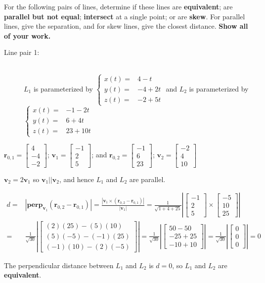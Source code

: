 \documentclass{article}
\newcommand{\abs}[1]{\left|#1\right|}
\newcommand{\colvec}[3]{\begin{bmatrix} #1 \\ #2 \\ #3 \end{bmatrix}}
\newcommand{\dr}[1]{\textcolor{dark_red}{#1}}
\begin{document}
For the following pairs of lines, determine if these lines are \textbf{equivalent}; are \textbf{parallel but not equal}; \textbf{intersect} at a single point; or are \textbf{skew}. For parallel lines, give the separation, and for skew lines, give the closest distance. \textbf{Show all of your work.}


\begin{description}
\item[Line pair 1:] ~ \\
\(L_1\) is parameterized by \(\left\{\begin{array}{rl} x(t) = & 4 - t \\ y(t) = & -4 + 2t \\ z(t) = & -2 + 5t \end{array}\right.\) and
\(L_2\) is parameterized by \(\left\{\begin{array}{rl} x(t) = & -1 - 2t \\ y(t) = & 6 + 4t \\ z(t) = & 23 + 10t \end{array}\right.\)
\end{description}

\dr{\(\mathbf{r}_{0,1} = \colvec{4}{-4}{-2}\); \(\mathbf{v}_1 = \colvec{-1}{2}{5}\); and \(\mathbf{r}_{0,2} = \colvec{-1}{6}{23}\); \(\mathbf{v}_2 = \colvec{-2}{4}{10}\)}

\dr{\(\mathbf{v}_2 = 2\mathbf{v}_1\) so \(\mathbf{v}_1 || \mathbf{v}_2\), and hence \(L_1\) and \(L_2\) are parallel.}

\dr{\begin{align*}
d = & \abs{\textbf{perp}_{\mathbf{v}_1}(\mathbf{r}_{0,2} - \mathbf{r}_{0,1})} 
= \frac{\abs{\mathbf{v}_1 \times (\mathbf{r}_{0,2} - \mathbf{r}_{0,1})}}{\abs{\mathbf{v}_1}} 
= \frac{1}{\sqrt{1 + 4 + 25}}\abs{\colvec{-1}{2}{5} \times \colvec{-5}{10}{25}} \\
= & \frac{1}{\sqrt{30}}\abs{\colvec{(2)(25) - (5)(10)}{(5)(-5) - (-1)(25)}{(-1)(10) - (2)(-5)}} 
= \frac{1}{\sqrt{30}}\abs{\colvec{50 - 50}{-25 + 25}{-10 + 10}}  
= \frac{1}{\sqrt{30}}\abs{\colvec{0}{0}{0}} 
= 0 
\end{align*}}

\dr{The perpendicular distance between \(L_1\) and \(L_2\) is \(d = 0\), so \(L_1\) and \(L_2\) are \textbf{equivalent}.}
\end{document}
